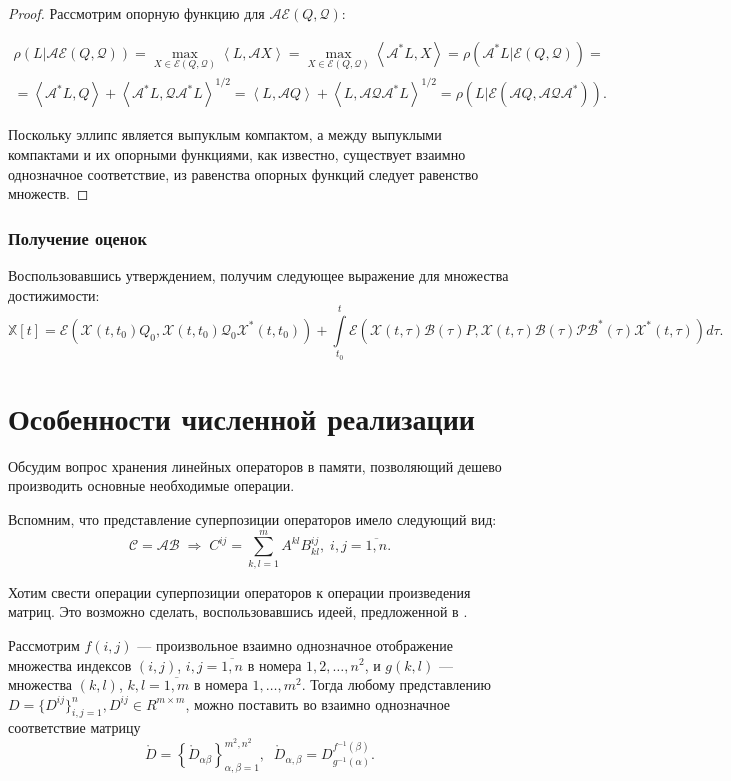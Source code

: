 \documentclass[12pt]{article}
\theoremstyle{rusdef}
\newcommand{\scalar}[2]{\left<#1,#2\right>}
\newcommand{\E}{\ensuremath{\mathcal{E}}} %
\begin{document}
\begin{proof}
Рассмотрим опорную функцию для $\mathcal{A}\E(Q,\mathcal{Q})$:

\begin{multline*}
\rho(L | \mathcal{A}\E(Q,\mathcal{Q})) = \max\limits_{X \in \E(Q,\mathcal{Q})} \scalar{L}{\mathcal{A}X} = \max\limits_{X \in \E(Q,\mathcal{Q})} \scalar{\mathcal{A}^*L}{X} = \rho(\mathcal{A}^*L | \E(Q,\mathcal{Q})) = \\ = \scalar{\mathcal{A}^*L}{Q} + \scalar{\mathcal{A}^*L}{\mathcal{Q}\mathcal{A}^*L}^{1/2} = \scalar{L}{\mathcal{A}Q} + \scalar{L}{\mathcal{A}\mathcal{Q}\mathcal{A}^*L}^{1/2} = \rho(L | \E(\mathcal{A}Q, \mathcal{A}\mathcal{Q}\mathcal{A}^*)).
\end{multline*}

Поскольку эллипс является выпуклым компактом, а между выпуклыми компактами и их опорными функциями, как известно, существует взаимно однозначное соответствие, из равенства опорных функций следует равенство множеств.
\end{proof}

\subsubsection*{Получение оценок}
Воспользовавшись утверждением, получим следующее выражение для множества достижимости:
$$
\mathbb{X}[t] = \E(\mathcal{X}(t,t_0)Q_0,\mathcal{X}(t,t_0)\mathcal{Q}_0\mathcal{X}^*(t,t_0)) + \int\limits_{t_0}^{t} \E(\mathcal{X}(t,\tau)\mathcal{B}(\tau)P,\mathcal{X}(t,\tau)\mathcal{B}(\tau)\mathcal{P}\mathcal{B}^*(\tau)\mathcal{X}^*(t,\tau)) d\tau.
$$

\newpage
\section{Особенности численной реализации}
Обсудим вопрос хранения линейных операторов в памяти, позволяющий дешево производить основные необходимые операции.

Вспомним, что представление суперпозиции операторов имело следующий вид:
$$
\mathcal{C} = \mathcal{A}\mathcal{B} \; \Rightarrow \; C^{ij} = \sum_{k,l=1}^{m} A^{kl}B^{ij}_{kl}, \; i,j = \overline{1,n}.
$$

Хотим свести операции суперпозиции операторов к операции произведения матриц. Это возможно сделать, воспользовавшись идеей, предложенной в \cite{month}. 

Рассмотрим $f(i,j)$ --- произвольное взаимно однозначное отображение множества индексов $(i,j)$, $i,j = \overline{1,n}$ в номера $1,2,\ldots,n^2$, и $g(k,l)$ --- множества $(k,l)$, $k,l=\overline{1,m}$ в номера $1,\ldots,m^2$. Тогда любому представлению $D = \{D^{ij}\}_{i,j=1}^n, D^{ij} \in R^{m \times m}$, можно поставить во взаимно однозначное соответствие матрицу
$$
\mathring{D} = \left\{ \mathring{D}_{\alpha\beta} \right\}_{\alpha,\beta = 1}^{m^2,n^2},\;\; \mathring{D}_{\alpha,\beta} = D_{g^{-1}(\alpha)}^{f^{-1}(\beta)}.
$$
\end{document}
